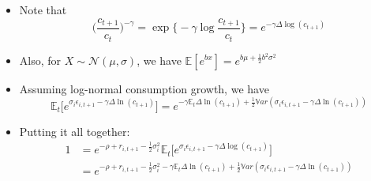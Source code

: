 \documentclass[10pt]{beamer}
\begin{document}
\begin{frame}{}
\begin{itemize}
\item Note that
\begin{equation*}
	\bigg( \frac{ c_{t+1}}{c_t} \bigg) ^{-\gamma} = \exp \bigg\{ - \gamma \log \frac{c_{t+1}}{c_t} \bigg\} = e^{- \gamma \Delta \log(c_{t+1}) }
\end{equation*}

\item Also, for $X \sim \mathcal N(\mu, \sigma)$, we have $\mathbb{E} [ e^{b x} ] = e^{ b \mu + \frac{1}{2} b^2 \sigma^2}$

\item Assuming log-normal consumption growth, we have
\begin{equation*}
	\mathbb{E}_t \bigg[ e^{ \sigma_i \epsilon_{i, t+1} - \gamma \Delta \ln(c_{t+1}) } \bigg] = e^{- \gamma \mathbb{E}_t \Delta \ln(c_{t+1}) + \frac{1}{2} \mathbb Var ( \sigma_i \epsilon_{i, t+1} - \gamma \Delta \ln(c_{t+1}) )}
\end{equation*}

\item Putting it all together:
\begin{align*}
	1 &= e^{- \rho + r_{i, t+1} - \frac{1}{2} \sigma_i^2} \mathbb E_t \bigg[ e^{\sigma_i \epsilon_{i, t+1} - \gamma \Delta \log(c_{t+1}) } \bigg] \\
	&= e^{- \rho + r_{i, t+1} - \frac{1}{2} \sigma_i^2 - \gamma \mathbb{E}_t \Delta \ln(c_{t+1}) + \frac{1}{2} \mathbb Var ( \sigma_i \epsilon_{i, t+1} - \gamma \Delta \ln(c_{t+1}) )}
\end{align*}
\end{itemize}
\end{frame}
\end{document}
